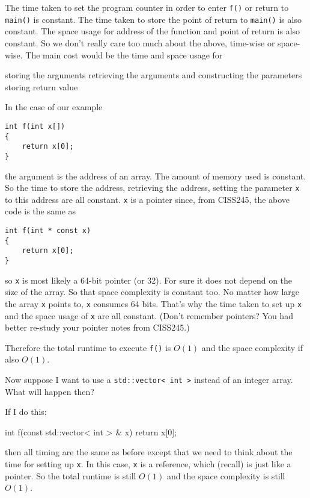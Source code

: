 The time taken to set the program counter in order to enter \verb!f()! or return to
\verb!main()! is constant.
The time taken to store the point of return to \verb!main()! is also constant.
The space usage for address of the function and point of return is also constant.
So we don't really care too much about the above, time-wise or space-wise.
The main cost would be the time and space usage for
\begin{tightlist}
  \li storing the arguments
  \li retrieving the arguments and constructing the parameters
  \li storing return value
\end{tightlist}

In the case of our example
\begin{Verbatim}[frame=single,fontsize=\footnotesize]
int f(int x[])
{
    return x[0];
}
\end{Verbatim}
the argument is the address of an array.
The amount of memory used is constant.
So the time to store the address,
retrieving the address, setting the parameter \verb!x! to this address
are all constant.
\verb!x! is a pointer since, from CISS245, the above code is the same
as
\begin{Verbatim}[frame=single,fontsize=\footnotesize]
int f(int * const x)
{
    return x[0];
}
\end{Verbatim}
so \verb!x! is most likely a 64-bit pointer (or 32).
For sure it does not depend on the size of the array.
So that space complexity is constant too.
No matter how large the array \verb!x! points to, \verb!x! consumes
64 bits.
That's why the time taken to set up \verb!x!
and the space usage of \verb!x! are all constant.
(Don't remember pointers?
You had better re-study your pointer notes from CISS245.)

Therefore the total runtime to execute \verb!f()! is $O(1)$
and the space complexity if also $O(1)$.

Now suppose I want to use a \verb!std::vector< int >! instead of an
integer array.
What will happen then?

If I do this:
\begin{console}
int f(const std::vector< int > & x)
{
    return x[0];
}
\end{console}
then all timing are the same as before except that we need to think about
the time for setting up \verb!x!.
In this case, \verb!x! is a reference, which (recall) is just like a pointer.
So the total runtime is still $O(1)$ and the space complexity is still $O(1)$.

